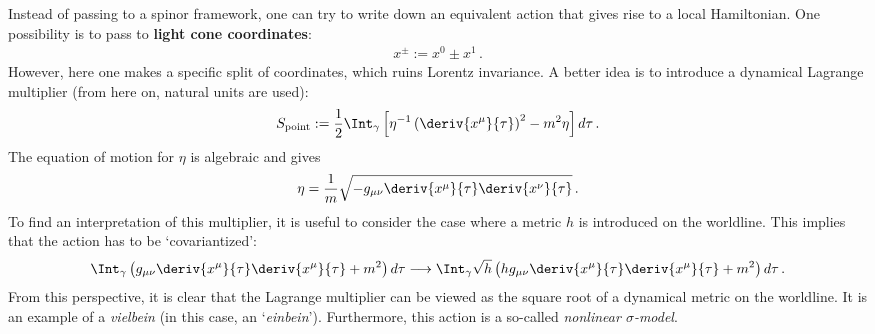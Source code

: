     Instead of passing to a spinor framework, one can try to write down an equivalent action that gives rise to a local Hamiltonian. One possibility is to pass to \textbf{light cone coordinates}:
    \begin{gather}
        x^\pm := x^0\pm x^1\,.
    \end{gather}
    However, here one makes a specific split of coordinates, which ruins Lorentz invariance. A better idea is to introduce a dynamical Lagrange multiplier (from here on, natural units are used):
    \begin{gather}
        S_{\text{point}} := \frac{1}{2}\Int_\gamma\left[\eta^{-1}\left(\deriv{x^\mu}{\tau}\right)^2-m^2\eta\right]d\tau\,.
    \end{gather}
    The equation of motion for $\eta$ is algebraic and gives
    \begin{gather}
        \eta = \frac{1}{m}\sqrt{-g_{\mu\nu}\deriv{x^\mu}{\tau}\deriv{x^\nu}{\tau}}\,.
    \end{gather}
    To find an interpretation of this multiplier, it is useful to consider the case where a metric $h$ is introduced on the worldline. This implies that the action has to be `covariantized':
    \begin{gather}
        \Int_\gamma\left(g_{\mu\nu}\deriv{x^\mu}{\tau}\deriv{x^\mu}{\tau}+m^2\right)d\tau\longrightarrow\Int_\gamma\sqrt{h}\left(hg_{\mu\nu}\deriv{x^\mu}{\tau}\deriv{x^\mu}{\tau}+m^2\right)d\tau\,.
    \end{gather}
    From this perspective, it is clear that the Lagrange multiplier can be viewed as the square root of a dynamical metric on the worldline. It is an example of a \textit{vielbein} (in this case, an `\textit{einbein}'). Furthermore, this action is a so-called \textit{nonlinear $\sigma$-model}.